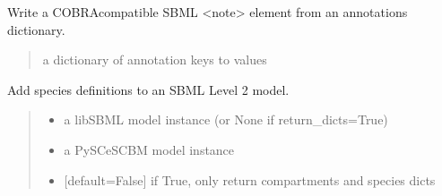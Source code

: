 \documentclass[letterpaper,12pt,english]{sphinxmanual}
\begin{document}
\begin{fulllineitems}
\label{\detokenize{api/io:cbmpy.CBXML.sbml_writeAnnotationsAsCOBRANote}}
\pysigstartsignatures
\pysiglinewithargsret
{}
{}
{}
\pysigstopsignatures
\sphinxAtStartPar
Write a COBRA\sphinxhyphen{}compatible SBML \textless{}note\textgreater{} element from an annotations dictionary.
\begin{quote}\begin{description}
\sphinxAtStartPar
{} \textendash{} a dictionary of annotation keys to values

\sphinxAtStartPar
{}

\end{description}\end{quote}

\end{fulllineitems}


\begin{fulllineitems}
\label{\detokenize{api/io:cbmpy.CBXML.sbml_setSpeciesL2}}
\pysigstartsignatures
\pysiglinewithargsret
{}
{\sphinxparamcomma {}\sphinxparamcomma {}}
{}
\pysigstopsignatures
\sphinxAtStartPar
Add species definitions to an SBML Level 2 model.
\begin{quote}\begin{description}
\begin{itemize}
\item {} 
\sphinxAtStartPar
{} \textendash{} a libSBML model instance (or None if return\_dicts=True)

\item {} 
\sphinxAtStartPar
{} \textendash{} a PySCeSCBM model instance

\item {} 
\sphinxAtStartPar
{} \textendash{} {[}default=False{]} if True, only return compartments and species dicts

\end{itemize}

\sphinxAtStartPar
{}

\end{description}\end{quote}

\end{fulllineitems}
\end{document}
